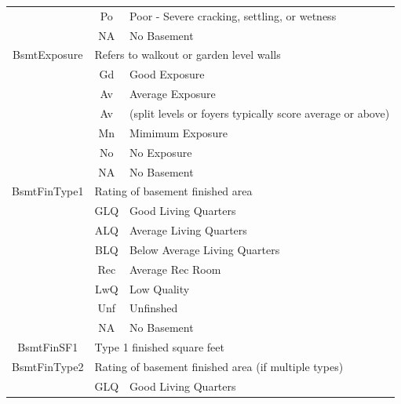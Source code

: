 \documentclass[11pt]{scrartcl} %
\begin{document}
\begin{center}
\begin{tabular}{c c c c c c}
\multicolumn{2}{|c}{} & \multicolumn{1}{c}{Po} & \multicolumn{3}{l|}{Poor - Severe cracking, settling, or wetness}\\
\multicolumn{2}{|c}{} & \multicolumn{1}{c}{NA} & \multicolumn{3}{l|}{No Basement}\\
\hline
\multicolumn{2}{|c}{BsmtExposure} & \multicolumn{4}{l|}{Refers to walkout or garden level walls}\\ 
\multicolumn{2}{|c}{} & \multicolumn{1}{c}{Gd} & \multicolumn{3}{l|}{Good Exposure}\\
\multicolumn{2}{|c}{} & \multicolumn{1}{c}{Av} & \multicolumn{3}{l|}{Average Exposure }\\
\multicolumn{2}{|c}{} & \multicolumn{1}{c}{Av} & \multicolumn{3}{l|}{(split levels or foyers typically score average or above)}\\
\multicolumn{2}{|c}{} & \multicolumn{1}{c}{Mn} & \multicolumn{3}{l|}{Mimimum Exposure}\\
\multicolumn{2}{|c}{} & \multicolumn{1}{c}{No} & \multicolumn{3}{l|}{No Exposure}\\
\multicolumn{2}{|c}{} & \multicolumn{1}{c}{NA} & \multicolumn{3}{l|}{No Basement}\\
\hline
\multicolumn{2}{|c}{BsmtFinType1} & \multicolumn{4}{l|}{Rating of basement finished area}\\ 
\multicolumn{2}{|c}{} & \multicolumn{1}{c}{GLQ} & \multicolumn{3}{l|}{Good Living Quarters}\\
\multicolumn{2}{|c}{} & \multicolumn{1}{c}{ALQ} & \multicolumn{3}{l|}{Average Living Quarters}\\
\multicolumn{2}{|c}{} & \multicolumn{1}{c}{BLQ} & \multicolumn{3}{l|}{Below Average Living Quarters}\\
\multicolumn{2}{|c}{} & \multicolumn{1}{c}{Rec} & \multicolumn{3}{l|}{Average Rec Room}\\
\multicolumn{2}{|c}{} & \multicolumn{1}{c}{LwQ} & \multicolumn{3}{l|}{Low Quality}\\
\multicolumn{2}{|c}{} & \multicolumn{1}{c}{Unf} & \multicolumn{3}{l|}{Unfinshed}\\
\multicolumn{2}{|c}{} & \multicolumn{1}{c}{NA} & \multicolumn{3}{l|}{No Basement}\\
\hline
\multicolumn{2}{|c}{BsmtFinSF1} & \multicolumn{4}{l|}{Type 1 finished square feet}\\
\hline
\multicolumn{2}{|c}{BsmtFinType2} & \multicolumn{4}{l|}{Rating of basement finished area (if multiple types)}\\ 
\multicolumn{2}{|c}{} & \multicolumn{1}{c}{GLQ} & \multicolumn{3}{l|}{Good Living Quarters}\\

\end{tabular}
\end{center}
\end{document}
